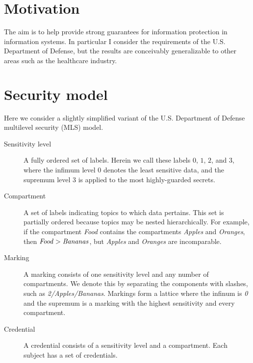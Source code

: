 \documentclass[twocolumn]{article}
\begin{document}

\section{Motivation}

The aim is to help provide strong guarantees for information protection in information systems. In particular I consider the requirements of the U.S. Department of Defense, but the results are conceivably generalizable to other areas such as the healthcare industry.

\section{Security model}

Here we consider a slightly simplified variant of the U.S. Department of Defense multilevel security (MLS) model.

\begin{description}

  \item[Sensitivity level] A fully ordered set of labels. Herein we call these labels $0$, $1$, $2$, and $3$, where the infimum level $0$ denotes the least sensitive data, and the supremum level $3$ is applied to the most highly-guarded secrets.

  \item[Compartment] A set of labels indicating topics to which data pertains. This set is partially ordered because topics may be nested hierarchically. For example, if the compartment {\it Food} contains the compartments {\it Apples} and {\it Oranges}, then ${\it Food} > {\it Bananas}$, but {\it Apples} and {\it Oranges} are incomparable.

  \item[Marking] A marking consists of one sensitivity level and any number of compartments. We denote this by separating the components with slashes, such as {\it 2/Apples/Bananas}. Markings form a lattice where the infinum is {\it 0} and the supremum is a marking with the highest sensitivity and every compartment.

  \item[Credential] A credential consists of a sensitivity level and a compartment. Each subject has a set of credentials.

\end{description}
\end{document}
